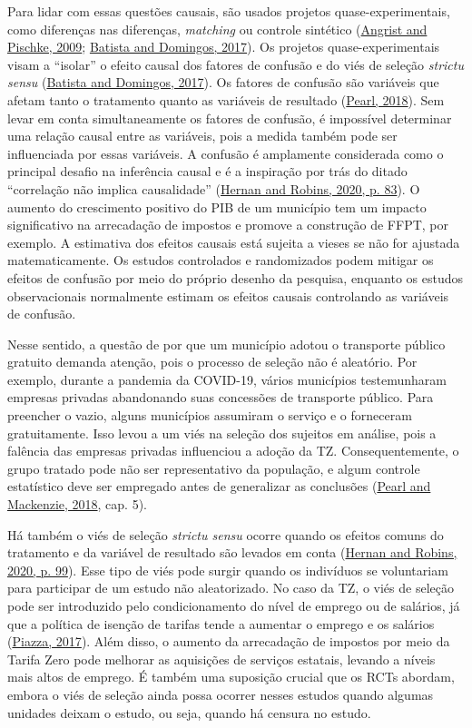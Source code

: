 \documentclass[12pt, a4paper, twoside]{article}
\numberwithin{equation}{subsection} %
\begin{document}
Para lidar com essas questões causais, são usados projetos
quase-experimentais, como diferenças nas diferenças, \textit{matching}
ou controle sintético
(\protect\hyperlink{ref-mostly_harmless_econometrics}{Angrist and
Pischke, 2009}; \protect\hyperlink{ref-batista_domingos_2017}{Batista
and Domingos, 2017}). Os projetos quase-experimentais visam a ``isolar''
o efeito causal dos fatores de confusão e do viés de seleção
\textit{strictu sensu}
(\protect\hyperlink{ref-batista_domingos_2017}{Batista and Domingos,
2017}). Os fatores de confusão são variáveis que afetam tanto o
tratamento quanto as variáveis de resultado
(\protect\hyperlink{ref-pearl2018}{Pearl, 2018}). Sem levar em conta
simultaneamente os fatores de confusão, é impossível determinar uma
relação causal entre as variáveis, pois a medida também pode ser
influenciada por essas variáveis. A confusão é amplamente considerada
como o principal desafio na inferência causal e é a inspiração por trás
do ditado ``correlação não implica causalidade''
(\protect\hyperlink{ref-Hernan2020}{Hernan and Robins, 2020, p. 83}). O
aumento do crescimento positivo do PIB de um município tem um impacto
significativo na arrecadação de impostos e promove a construção de FFPT,
por exemplo. A estimativa dos efeitos causais está sujeita a vieses se
não for ajustada matematicamente. Os estudos controlados e randomizados
podem mitigar os efeitos de confusão por meio do próprio desenho da
pesquisa, enquanto os estudos observacionais normalmente estimam os
efeitos causais controlando as variáveis de confusão.

Nesse sentido, a questão de por que um município adotou o transporte
público gratuito demanda atenção, pois o processo de seleção não é
aleatório. Por exemplo, durante a pandemia da COVID-19, vários
municípios testemunharam empresas privadas abandonando suas concessões
de transporte público. Para preencher o vazio, alguns municípios
assumiram o serviço e o forneceram gratuitamente. Isso levou a um viés
na seleção dos sujeitos em análise, pois a falência das empresas
privadas influenciou a adoção da TZ. Consequentemente, o grupo tratado
pode não ser representativo da população, e algum controle estatístico
deve ser empregado antes de generalizar as conclusões
(\protect\hyperlink{ref-PearlMackenzie18}{Pearl and Mackenzie, 2018},
cap. 5).

Há também o viés de seleção \textit{strictu sensu} ocorre quando os
efeitos comuns do tratamento e da variável de resultado são levados em
conta (\protect\hyperlink{ref-Hernan2020}{Hernan and Robins, 2020, p.
99}). Esse tipo de viés pode surgir quando os indivíduos se voluntariam
para participar de um estudo não aleatorizado. No caso da TZ, o viés de
seleção pode ser introduzido pelo condicionamento do nível de emprego ou
de salários, já que a política de isenção de tarifas tende a aumentar o
emprego e os salários
(\protect\hyperlink{ref-piazza_avaliacao_2017}{Piazza, 2017}). Além
disso, o aumento da arrecadação de impostos por meio da Tarifa Zero pode
melhorar as aquisições de serviços estatais, levando a níveis mais altos
de emprego. É também uma suposição crucial que os RCTs abordam, embora o
viés de seleção ainda possa ocorrer nesses estudos quando algumas
unidades deixam o estudo, ou seja, quando há censura no estudo.
\end{document}
